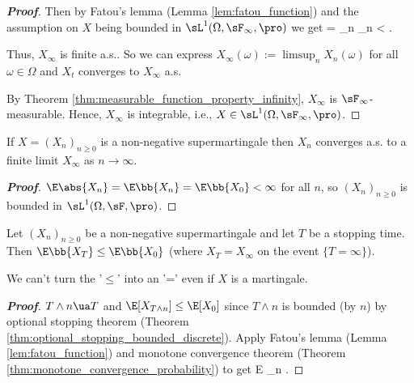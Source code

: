 \begin{proof}[\bf Proof]
Then by Fatou's lemma (Lemma \ref{lem:fatou_function}) and the assumption on $X$ being bounded in $\sL^1(\Omega,\sF_\infty,\pro)$ we get \be \E{} = \E {} \leq \liminf_n \E{} \leq
\sup_n \E{} < \infty. \ee

Thus, $X_\infty$ is finite a.s.. So we can express $X_\infty(\omega) := \limsup_n X_n(\omega)$ for all $\omega\in \Omega$ and $X_t$ converges to $X_\infty$ a.s.

By Theorem \ref{thm:measurable_function_property_infinity}, $X_\infty$ is $\sF_{\infty}$-measurable. Hence, $X_\infty$ is integrable, i.e., $X\in \sL^1(\Omega,\sF_\infty,\pro)$. %
\end{proof}

\begin{corollary}
If $X = (X_n)_{n \geq 0}$ is a non-negative supermartingale then $X_n$ converges a.s. to a finite limit $X_\infty$ as $n\to \infty$.
\end{corollary}

\begin{proof}[\bf Proof]
$\E\abs{X_n} = \E\bb{X_n} = \E\bb{X_0} <\infty$ for all $n$, so $(X_n)_{n \geq 0}$ is bounded in $\sL^1(\Omega,\sF,\pro)$.
\end{proof}


\begin{corollary}
Let $(X_n)_{n \geq 0}$ be a non-negative supermartingale and let $T$ be a stopping time. Then $\E\bb{X_T} \leq \E\bb{X_0}$ (where $X_T = X_\infty$ on the event $\{T = \infty\}$).
\end{corollary}

\begin{remark}
We can't turn the '$\leq$' into an '=' even if $X$ is a martingale. %
\end{remark}

\begin{proof}[\bf Proof]
$T \land n \ua T$ and $\E[X_{T\land n}] \leq \E[X_0]$ since $T \land n$ is bounded (by $n$) by optional stopping theorem (Theorem \ref{thm:optional_stopping_bounded_discrete}). Apply Fatou's lemma (Lemma \ref{lem:fatou_function}) and monotone convergence theorem (Theorem \ref{thm:monotone_convergence_probability}) to get
\be
E \geq \liminf_{n\to \infty} \E{} \geq \E{} \ua  \E{}.
\ee
\end{proof}


